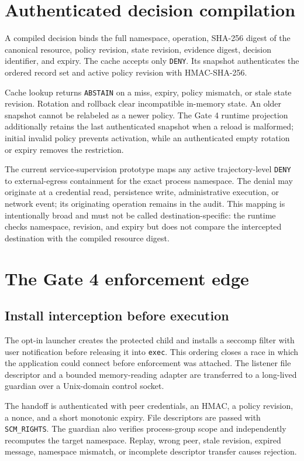 \documentclass[11pt,a4paper]{article}
\begin{document}
\section{Authenticated decision compilation}

A compiled decision binds the full namespace, operation, SHA-256 digest of the
canonical resource, policy revision, state revision, evidence digest, decision
identifier, and expiry. The cache accepts only \texttt{DENY}. Its snapshot
authenticates the ordered record set and active policy revision with
HMAC-SHA-256.

Cache lookup returns \texttt{ABSTAIN} on a miss, expiry, policy mismatch, or
stale state revision. Rotation and rollback clear incompatible in-memory state.
An older snapshot cannot be relabeled as a newer policy. The Gate 4 runtime
projection additionally retains the last authenticated snapshot when a reload
is malformed; initial invalid policy prevents activation, while an authenticated
empty rotation or expiry removes the restriction.

The current service-supervision prototype maps any active trajectory-level
\texttt{DENY} to external-egress containment for the exact process namespace.
The denial may originate at a credential read, persistence write,
administrative execution, or network event; its originating operation remains
in the audit. This mapping is intentionally broad and must not be called
destination-specific: the runtime checks namespace, revision, and expiry but
does not compare the intercepted destination with the compiled resource digest.

\section{The Gate 4 enforcement edge}

\subsection{Install interception before execution}

The opt-in launcher creates the protected child and installs a seccomp filter
with user notification before releasing it into \texttt{exec}. This ordering
closes a race in which the application could connect before enforcement was
attached. The listener file descriptor and a bounded memory-reading adapter are
transferred to a long-lived guardian over a Unix-domain control socket.

The handoff is authenticated with peer credentials, an HMAC, a policy revision,
a nonce, and a short monotonic expiry. File descriptors are passed with
\texttt{SCM\_RIGHTS}. The guardian also verifies process-group scope and
independently recomputes the target namespace. Replay, wrong peer, stale
revision, expired message, namespace mismatch, or incomplete descriptor transfer
causes rejection.
\end{document}
